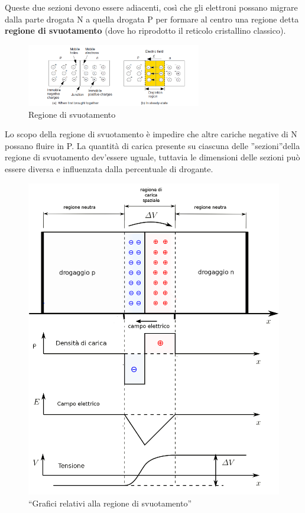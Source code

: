\documentclass[
]{article}
\begin{document}
Queste due sezioni devono essere adiacenti, così che gli elettroni
possano migrare dalla parte drogata N a quella drogata P per formare al
centro una regione detta \textbf{regione di svuotamento} (dove ho
riprodotto il reticolo cristallino classico).

\begin{figure}
\centering
\includegraphics[width=0.68\textwidth,height=\textheight]{immagini/1.png}
\caption{Regione di svuotamento}
\end{figure}

Lo scopo della regione di svuotamento è impedire che altre cariche
negative di N possano fluire in P. La quantità di carica presente su
ciascuna delle ''sezioni''della regione di svuotamento dev'essere
uguale, tuttavia le dimensioni delle sezioni può essere diversa e
influenzata dalla percentuale di drogante.

\begin{figure}
\centering
\includegraphics[width=\textwidth,height=0.35\textheight]{immagini/2.png}
\caption{``Grafici relativi alla regione di svuotamento''}
\end{figure}
\end{document}
